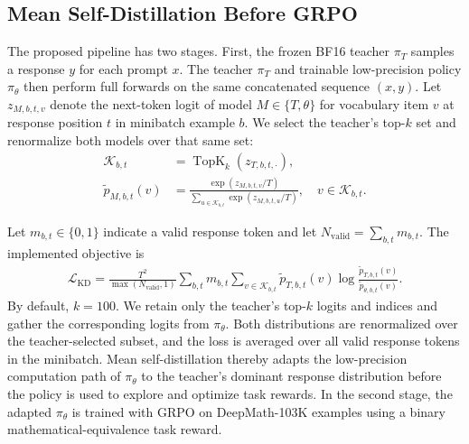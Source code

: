 \documentclass[letterpaper]{article}
\begin{document}
\subsection{Mean Self-Distillation Before GRPO}

The proposed pipeline has two stages. First, the frozen BF16 teacher $\pi_T$ samples a response $y$ for each prompt $x$. The teacher $\pi_T$ and trainable low-precision policy $\pi_\theta$ then perform full forwards on the same concatenated sequence $(x,y)$. Let $z_{M,b,t,v}$ denote the next-token logit of model $M\in\{T,\theta\}$ for vocabulary item $v$ at response position $t$ in minibatch example $b$. We select the teacher's top-$k$ set and renormalize both models over that same set:
\begin{equation}
\begin{aligned}
\mathcal{K}_{b,t}
&=\operatorname{TopK}_k\!\left(z_{T,b,t,\cdot}\right),\\
\widetilde p_{M,b,t}(v)
&=\frac{\exp(z_{M,b,t,v}/T)}
{\sum_{u\in\mathcal{K}_{b,t}}\exp(z_{M,b,t,u}/T)},
\quad v\in\mathcal{K}_{b,t}.
\end{aligned}
\end{equation}

Let $m_{b,t}\in\{0,1\}$ indicate a valid response token and let $N_{\mathrm{valid}}=\sum_{b,t}m_{b,t}$. The implemented objective is
\begin{equation}
\begin{aligned}
\mathcal{L}_{\mathrm{KD}}
=\frac{T^2}{\max(N_{\mathrm{valid}},1)}
\sum_{b,t}m_{b,t}
\sum_{v\in\mathcal{K}_{b,t}}
\widetilde p_{T,b,t}(v)
\log\frac{\widetilde p_{T,b,t}(v)}
{\widetilde p_{\theta,b,t}(v)}.
\end{aligned}
\label{eq:topk-distillation}
\end{equation}
By default, $k=100$. We retain only the teacher's top-$k$ logits and indices and gather the corresponding logits from $\pi_\theta$. Both distributions are renormalized over the teacher-selected subset, and the loss is averaged over all valid response tokens in the minibatch. Mean self-distillation thereby adapts the low-precision computation path of $\pi_\theta$ to the teacher's dominant response distribution before the policy is used to explore and optimize task rewards. In the second stage, the adapted $\pi_\theta$ is trained with GRPO on DeepMath-103K examples using a binary mathematical-equivalence task reward.
\end{document}
